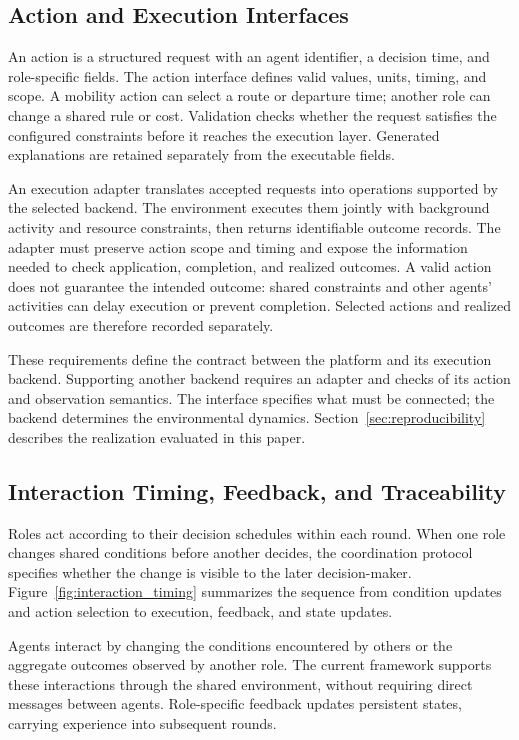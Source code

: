 \subsection{Action and Execution Interfaces}
\label{sec:actions}

An action is a structured request with an agent identifier, a decision time, and role-specific fields. The action interface defines valid values, units, timing, and scope. A mobility action can select a route or departure time; another role can change a shared rule or cost. Validation checks whether the request satisfies the configured constraints before it reaches the execution layer. Generated explanations are retained separately from the executable fields.

An execution adapter translates accepted requests into operations supported by the selected backend. The environment executes them jointly with background activity and resource constraints, then returns identifiable outcome records. The adapter must preserve action scope and timing and expose the information needed to check application, completion, and realized outcomes. A valid action does not guarantee the intended outcome:
shared constraints and other agents' activities can delay
execution or prevent completion. Selected actions and
realized outcomes are therefore recorded separately.

These requirements define the contract between the platform and its execution backend. Supporting another backend requires an adapter and checks of its action and observation semantics. The interface specifies what must be connected; the backend determines the environmental dynamics. Section~\ref{sec:reproducibility} describes the realization evaluated in this paper.

\subsection{Interaction Timing, Feedback, and Traceability}

Roles act according to their decision schedules within each
round. When one role changes shared conditions before another
decides, the coordination protocol specifies whether the
change is visible to the later decision-maker.
Figure~\ref{fig:interaction_timing} summarizes the sequence
from condition updates and action selection to execution,
feedback, and state updates.

Agents interact by changing the conditions encountered by
others or the aggregate outcomes observed by another role.
The current framework supports these interactions through
the shared environment, without requiring direct messages
between agents. Role-specific feedback updates persistent
states, carrying experience into subsequent rounds.

